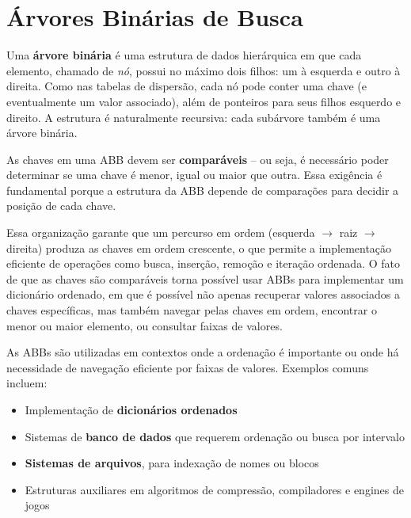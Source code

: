 \chapter{Árvores Binárias de Busca}

Uma \textbf{árvore binária} é uma estrutura de dados hierárquica em que cada elemento, chamado de \emph{nó}, possui no máximo dois filhos: um à esquerda e outro à direita. 
Como nas tabelas de dispersão, cada nó pode conter uma chave (e eventualmente um valor associado), além de ponteiros para seus filhos esquerdo e direito. 
A estrutura é naturalmente recursiva: cada subárvore também é uma árvore binária.

As chaves em uma ABB devem ser \textbf{comparáveis} -- ou seja, é necessário poder determinar se uma chave é menor, igual ou maior que outra. 
Essa exigência é fundamental porque a estrutura da ABB depende de comparações para decidir a posição de cada chave.

\begin{center}
\noindent{}
\end{center}


Essa organização garante que um percurso em ordem (esquerda $\rightarrow$ raiz $\rightarrow$ direita) produza as chaves em ordem crescente, o que permite a implementação eficiente de operações como busca, inserção, remoção e iteração ordenada.
 O fato de que as chaves são comparáveis torna possível usar ABBs para implementar um dicionário ordenado, em que é possível não apenas recuperar valores associados a chaves específicas, mas também navegar pelas chaves em ordem, encontrar o menor ou maior elemento, ou consultar faixas de valores.


As ABBs são utilizadas em contextos onde a ordenação é importante ou onde há necessidade de navegação eficiente por faixas de valores. Exemplos comuns incluem:

\begin{itemize}
  \item Implementação de \textbf{dicionários ordenados}
  \item Sistemas de \textbf{banco de dados} que requerem ordenação ou busca por intervalo
  \item \textbf{Sistemas de arquivos}, para indexação de nomes ou blocos
  \item Estruturas auxiliares em algoritmos de compressão, compiladores e engines de jogos
\end{itemize}

